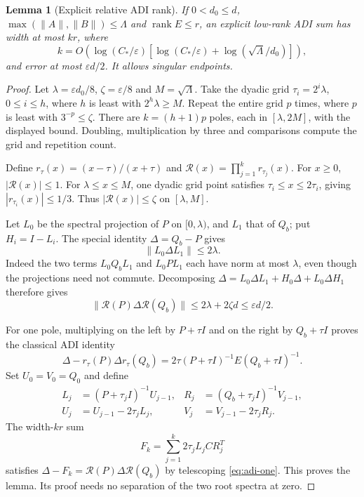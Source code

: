 \documentclass[11pt]{article}
\newtheorem{lemma}[theorem]{Lemma}
\numberwithin{equation}{section}
\newcommand{\rank}{\operatorname{rank}}
\newcommand{\cR}{\mathcal R}
\begin{document}
\begin{lemma}[Explicit relative ADI rank]\label{lem:adi-rank}
If $0<d_0\le d$, $\max(\|A\|,\|B\|)\le\Lambda$ and
$\rank E\le r$, an explicit low-rank ADI sum has width at most $kr$,
where
\[
 k=O\left(\log(C_*/\varepsilon)
   [\log(C_*/\varepsilon)+\log(\sqrt\Lambda/d_0)]\right),
\]
and error at most $\varepsilon d/2$. It allows singular endpoints.
\end{lemma}
\begin{proof}
Let $\lambda=\varepsilon d_0/8$, $\zeta=\varepsilon/8$ and
$M=\sqrt\Lambda$. Take the dyadic grid
$\tau_i=2^i\lambda$, $0\le i\le h$, where $h$ is least with
$2^h\lambda\ge M$. Repeat the entire grid $p$ times, where $p$ is
least with $3^{-p}\le\zeta$. There are $k=(h+1)p$ poles, each in
$[\lambda,2M]$, with the displayed bound. Doubling, multiplication by
three and comparisons compute the grid and repetition count.

Define $r_\tau(x)=(x-\tau)/(x+\tau)$ and
$\cR(x)=\prod_{j=1}^k r_{\tau_j}(x)$. For $x\ge0$,
$|\cR(x)|\le1$. For $\lambda\le x\le M$, one dyadic grid point
satisfies $\tau_i\le x\le2\tau_i$, giving $|r_{\tau_i}(x)|\le1/3$.
Thus $|\cR(x)|\le\zeta$ on $[\lambda,M]$.

Let $L_0$ be the spectral projection of $P$ on $[0,\lambda)$, and
$L_1$ that of $Q_b$; put $H_i=I-L_i$. The special identity
$\Delta=Q_b-P$ gives
\begin{equation}\label{eq:lowlow}
 \|L_0\Delta L_1\|\le2\lambda.
\end{equation}
Indeed the two terms $L_0Q_bL_1$ and $L_0PL_1$ each have norm at
most $\lambda$, even though the projections need not commute.
Decomposing $\Delta=L_0\Delta L_1+H_0\Delta+L_0\Delta H_1$
therefore gives
\begin{equation}\label{eq:adi-error}
 \|\cR(P)\Delta\cR(Q_b)\|
 \le2\lambda+2\zeta d\le\varepsilon d/2.
\end{equation}

For one pole, multiplying on the left by $P+\tau I$ and on the
right by $Q_b+\tau I$ proves the classical ADI identity
\begin{equation}\label{eq:adi-one}
 \Delta-r_\tau(P)\Delta r_\tau(Q_b)
       =2\tau(P+\tau I)^{-1}E(Q_b+\tau I)^{-1}.
\end{equation}
Set $U_0=V_0=Q_0$ and define
\begin{align}
 L_j&=(P+\tau_jI)^{-1}U_{j-1},&
 R_j&=(Q_b+\tau_jI)^{-1}V_{j-1},\label{eq:adi-factors}\\
 U_j&=U_{j-1}-2\tau_jL_j,&
 V_j&=V_{j-1}-2\tau_jR_j.\nonumber
\end{align}
The width-$kr$ sum
\begin{equation}\label{eq:adi-sum}
 F_k=\sum_{j=1}^k2\tau_jL_jCR_j^T
\end{equation}
satisfies $\Delta-F_k=\cR(P)\Delta\cR(Q_b)$ by telescoping
\eqref{eq:adi-one}. This proves the lemma. Its proof needs no
separation of the two root spectra at zero.
\end{proof}
\end{document}
